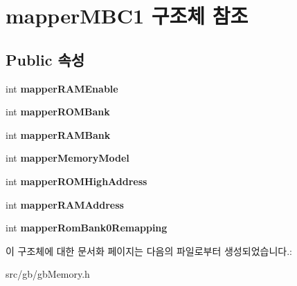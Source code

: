 \hypertarget{structmapper_m_b_c1}{}\section{mapper\+M\+B\+C1 구조체 참조}
\label{structmapper_m_b_c1}
\subsection*{Public 속성}
\begin{DoxyCompactItemize}
\item 
\mbox{\label{structmapper_m_b_c1_a444aae31d54f8f68f4d141bc21efc2a3}} 
int {\bfseries mapper\+R\+A\+M\+Enable}
\item 
\mbox{\label{structmapper_m_b_c1_a4ef895e141334ea18c5f4af278b3bc76}} 
int {\bfseries mapper\+R\+O\+M\+Bank}
\item 
\mbox{\label{structmapper_m_b_c1_a69513ec2d0118ee2f3b0d7e570f01f77}} 
int {\bfseries mapper\+R\+A\+M\+Bank}
\item 
\mbox{\label{structmapper_m_b_c1_a935a1164b520c174208742d6b530eef7}} 
int {\bfseries mapper\+Memory\+Model}
\item 
\mbox{\label{structmapper_m_b_c1_a3f67a98b1f2e81822fb700afeb9cbbe6}} 
int {\bfseries mapper\+R\+O\+M\+High\+Address}
\item 
\mbox{\label{structmapper_m_b_c1_a6dcbb2f1cdcd7b0345786002921bfae9}} 
int {\bfseries mapper\+R\+A\+M\+Address}
\item 
\mbox{\label{structmapper_m_b_c1_a617ace83f58c31fcc09c685ad8cabb40}} 
int {\bfseries mapper\+Rom\+Bank0\+Remapping}
\end{DoxyCompactItemize}


이 구조체에 대한 문서화 페이지는 다음의 파일로부터 생성되었습니다.\+:\begin{DoxyCompactItemize}
\item 
src/gb/gb\+Memory.\+h\end{DoxyCompactItemize}

